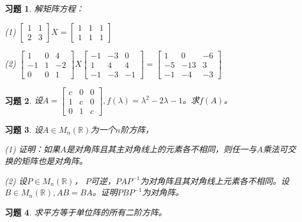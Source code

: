 \documentclass[a4paper]{book}
\newtheorem{ex}{习题}[chapter]
\newcommand{\enum}{\begin{list}{}{\setlength{\leftmargin}{0pt} \setlength{\itemindent}{2.5em} \setlength{\listparindent}{2em}}}
\begin{document}
\begin{ex} \label{ex:3.13}
解矩阵方程：

\enum
\item[(1)] $\begin{bmatrix} 1 & 1 \\ 2 & 3 \end{bmatrix} X = \begin{bmatrix} 1 & 1 & 1 \\ 1 & 1 & 1 \end{bmatrix}$

\item[(2)] $\begin{bmatrix} 1 & 0 & 4 \\ -1 & 1 & -2 \\ 0 & 0 & 1 \end{bmatrix} X \begin{bmatrix} -1 & -3 & 0 \\ 1 & 4 & 4 \\ -1 & -3 & -1 \end{bmatrix} = \begin{bmatrix} 1 & 0 & -6 \\ -5 & -13 & 3 \\ -1 & -4 & -3 \end{bmatrix}$
\end{list}
\end{ex}

\begin{ex} \label{ex:3.14}
设$A = \begin{bmatrix} c & 0 & 0 \\ 1 & c & 0 \\ 0 & 1 & c \end{bmatrix}, f(\lambda) = \lambda^2 - 2\lambda - 1$。求$f(A)$。
\end{ex}

\begin{ex} \label{ex:3.15}
设$A\in M_n(\mathbb{R})$为一个$n$阶方阵，

\enum
\item[(1)] 证明：如果$A$是对角阵且其主对角线上的元素各不相同，则任一与$A$乘法可交换的矩阵也是对角阵。

\item[(2)] 设$P\in M_n(\mathbb{R})$， $P$可逆，$PAP^{-1}$为对角阵且其对角线上元素各不相同。设$B\in M_n(\mathbb{R}), AB = BA$。证明$PBP^{-1}$为对角阵。
\end{list}
\end{ex}

\begin{ex} \label{ex:3.16}
求平方等于单位阵的所有二阶方阵。
\end{ex}
\end{document}
